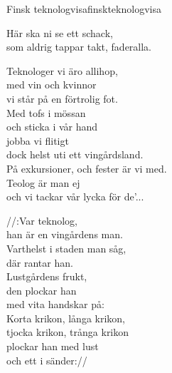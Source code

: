 \begin{song}{Finsk teknologvisa}{finskteknologvisa}
\begin{vers}
Här ska ni se ett schack,\\
som aldrig tappar takt, faderalla.
\end{vers}
\begin{vers}
Teknologer vi äro allihop,\\
med vin och kvinnor\\%
vi står på en förtrolig fot.\\
Med tofs i mössan\\
och sticka i vår hand\\
jobba vi flitigt\\
dock helst uti ett vingårdsland.\\
På exkursioner, och fester är vi med.\\
Teolog är man ej\\
och vi tackar vår lycka för de'...\\
\end{vers}
\begin{vers}
//:Var teknolog,\\
han är en vingårdens man.\\ %
Varthelst i staden man såg,\\
där rantar han.\\ %
Lustgårdens frukt,\\
den plockar han\\ %
med vita handskar på:\\
Korta krikon, långa krikon,\\ %
tjocka krikon, trånga krikon\\ %
plockar han med lust\\ %
och ett i sänder://\\
\end{vers}
\end{song}

